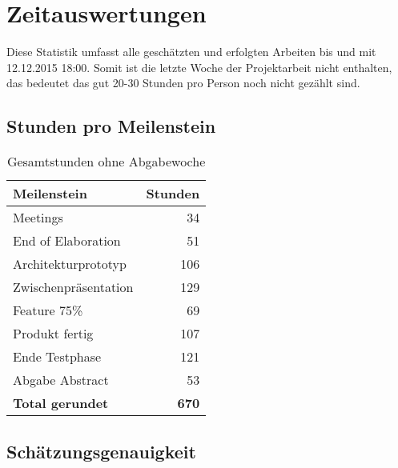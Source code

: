 \section{Zeitauswertungen}
\label{sec:time_results}

Diese Statistik umfasst alle geschätzten und erfolgten Arbeiten bis und mit 12.12.2015 18:00. Somit ist die letzte Woche der Projektarbeit nicht enthalten, das bedeutet das gut 20-30 Stunden pro Person noch nicht gezählt sind.

\subsection{Stunden pro Meilenstein}
\label{sec:per_milestone}

\begin{table}[H]
\begin{center}
\begin{tabularx}{6cm}{ l | r }
\textbf{Meilenstein} & \textbf{Stunden} \\ \hline
Meetings             & 34  \\ \hline
End of Elaboration   & 51  \\ \hline
Architekturprototyp  & 106 \\ \hline
Zwischenpräsentation & 129 \\ \hline
Feature 75\%         & 69  \\ \hline
Produkt fertig       & 107  \\ \hline
Ende Testphase       & 121  \\ \hline
Abgabe Abstract      & 53  \\ \hline
\textbf{Total gerundet} & \textbf{670}  \\ \hline
\end{tabularx}
\caption{Gesamtstunden ohne Abgabewoche}
\label{table:total_hours}
\end{center}
\end{table}

\subsection{Schätzungsgenauigkeit}
\label{sec:estimation_accuracy}

